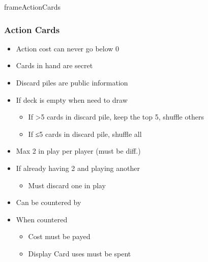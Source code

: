 \documentclass[10pt]{article}
\newlength{\fhActionCards} \setlength\fhActionCards{17\baselineskip}
\begin{document}
\begin{dynamiccontents*}{frameActionCards}\begin{eubox}{\fhActionCards}
	\subsubsection*{Action Cards }
	\begin{itemize}
		\item Action cost can never go below 0
		\item Cards in hand are secret
		\item Discard piles are public information
		\item If deck is empty when need to draw 
		\begin{itemize}
			\item If >5 cards in discard pile, keep the top 5, shuffle others
			\item If ≤5 cards in discard pile, shuffle all
		\end{itemize}
	\end{itemize}
	\begin{itemize}
		\item Max 2 in play per player (must be diff.)
		\item If already having 2 and playing another
		\begin{itemize}
			\item Must discard one in play
		\end{itemize}
	\end{itemize}
	\begin{itemize}
		\item Can be countered by 
		\item When countered
		\begin{itemize}
			\item Cost must be payed
			\item Display Card uses must be spent
		\end{itemize}
	\end{itemize}
\end{eubox}\end{dynamiccontents*}
\end{document}
